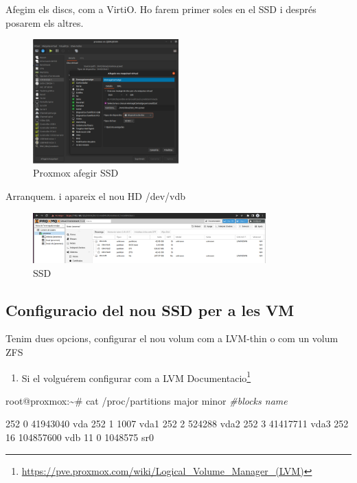 \documentclass[
  10pt,
]{krantz}
\newenvironment{Shaded}{\begin{snugshade}}{\end{snugshade}}
\newcommand{\CommentTok}[1]{\textcolor[rgb]{0.56,0.35,0.01}{\textit{#1}}}
\newcommand{\ExtensionTok}[1]{#1}
\newcommand{\NormalTok}[1]{#1}
\DeclareRobustCommand{\href}[2]{#2\footnote{\url{#1}}}
\providecommand{\tightlist}{%
  \setlength{\itemsep}{0pt}\setlength{\parskip}{0pt}}
\begin{document}
Afegim els discs, com a VirtiO. Ho farem primer soles en el SSD i després posarem els altres.

\begin{figure}
\centering
\includegraphics[width=0.5\textwidth,height=\textheight]{imatges/proxmox/proxmov_af_ssd.png}
\caption{Proxmox afegir SSD}
\end{figure}

Arranquem. i apareix el nou HD /dev/vdb

\begin{figure}
\centering
\includegraphics[width=0.8\textwidth,height=\textheight]{imatges/proxmox/proxmox_nou_ssd.png}
\caption{SSD}
\end{figure}

\hypertarget{configuracio-del-nou-ssd-per-a-les-vm}{%
\subsection{Configuracio del nou SSD per a les VM}\label{configuracio-del-nou-ssd-per-a-les-vm}}

Tenim dues opcions, configurar el nou volum com a LVM-thin o com un volum ZFS

\begin{enumerate}
\def\labelenumi{\arabic{enumi}.}
\tightlist
\item
  Si el volguérem configurar com a LVM \href{https://pve.proxmox.com/wiki/Logical_Volume_Manager_(LVM)}{Documentacio}
\end{enumerate}

\begin{Shaded}
\begin{Highlighting}[]
\ExtensionTok{root@proxmox:\textasciitilde{}\#}\NormalTok{ cat /proc/partitions }
\ExtensionTok{major}\NormalTok{ minor  }\CommentTok{\#blocks  name}

 \ExtensionTok{252}\NormalTok{        0   41943040 vda}
 \ExtensionTok{252}\NormalTok{        1       1007 vda1}
 \ExtensionTok{252}\NormalTok{        2     524288 vda2}
 \ExtensionTok{252}\NormalTok{        3   41417711 vda3}
 \ExtensionTok{252}\NormalTok{       16  104857600 vdb}
  \ExtensionTok{11}\NormalTok{        0    1048575 sr0}
\end{Highlighting}
\end{Shaded}
\end{document}
